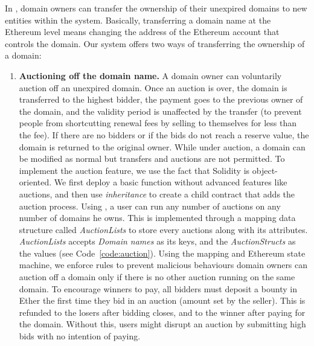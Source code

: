 \noindent In \Ghazal, domain owners can transfer the ownership of their unexpired domains to new entities within the system. Basically, transferring a domain name at the Ethereum level means changing the address of the Ethereum account that controls the domain. Our system offers two ways of transferring the ownership of a domain:

\begin{enumerate}

\item \textbf{Auctioning off the domain name.} A domain owner can voluntarily auction off an unexpired domain. Once an auction is over, the domain is transferred to the highest bidder, the payment goes to the previous owner of the domain, and the validity period is unaffected by the transfer (to prevent people from shortcutting renewal fees by selling to themselves for less than the fee). If there are no bidders or if the bids do not reach a reserve value, the domain is returned to the original owner. While under auction, a domain can be modified as normal but transfers and auctions are not permitted. To implement the auction feature, we use the fact that Solidity is object-oriented. We first deploy a basic \Ghazal function without advanced features like auctions, and then use \textit{inheritance} to create a child contract \Ghazalstar that adds the auction process. Using \Ghazalstar, a user can run any number of auctions on any number of domains he owns. This is implemented through a mapping data structure called \textit{AuctionLists} to store every auctions along with its attributes. \textit{AuctionLists} accepts \textit{Domain names} as its keys, and the \textit{AuctionStructs} as the values (see Code~\ref{code:auction}). Using the mapping and Ethereum state machine, we enforce rules to prevent malicious behaviours \eg domain owners can auction off a domain only if there is no other auction running on the same domain. To encourage winners to pay, all bidders must deposit a bounty in Ether the first time they bid in an auction (amount set by the seller). This is refunded to the losers after bidding closes, and to the winner after paying for the domain. Without this, users might disrupt an auction by submitting high bids with no intention of paying. 



\end{enumerate}
